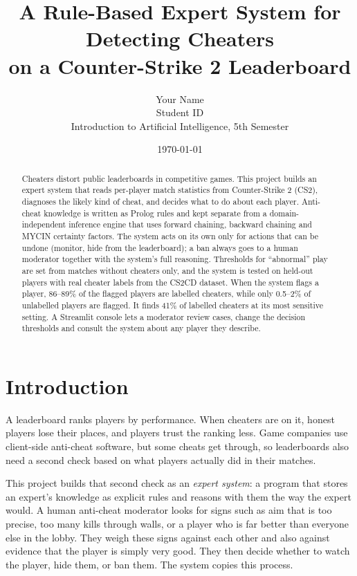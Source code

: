 \documentclass[11pt,a4paper]{article}
\title{A Rule-Based Expert System for Detecting Cheaters\\on a Counter-Strike 2 Leaderboard}
\author{Your Name \\ Student ID \\[4pt] \small Introduction to Artificial Intelligence, 5th Semester}
\date{\today}
\begin{document}
\maketitle

\begin{abstract}
Cheaters distort public leaderboards in competitive games. This project builds an expert system that
reads per-player match statistics from Counter-Strike 2 (CS2), diagnoses the likely kind of cheat,
and decides what to do about each player. Anti-cheat knowledge is written as Prolog rules and kept
separate from a domain-independent inference engine that uses forward chaining, backward chaining
and MYCIN certainty factors. The system acts on its own only for actions that can be undone
(monitor, hide from the leaderboard); a ban always goes to a human moderator together with the
system's full reasoning. Thresholds for ``abnormal'' play are set from matches without cheaters only,
and the system is tested on held-out players with real cheater labels from the CS2CD dataset. When
the system flags a player, 86--89\% of the flagged players are labelled cheaters, while only 0.5--2\%
of unlabelled players are flagged. It finds 41\% of labelled cheaters at its most sensitive setting.
A Streamlit console lets a moderator review cases, change the decision thresholds and consult the
system about any player they describe.
\end{abstract}

\section{Introduction}

A leaderboard ranks players by performance. When cheaters are on it, honest players lose their
places, and players trust the ranking less. Game companies use client-side anti-cheat software, but some
cheats get through, so leaderboards also need a second check based on what players actually did in
their matches.

This project builds that second check as an \emph{expert system}: a program that stores an expert's
knowledge as explicit rules and reasons with them the way the expert would. A human anti-cheat
moderator looks for signs such as aim that is too precise, too many kills through walls, or a player
who is far better than everyone else in the lobby. They weigh these signs against each other and
also against evidence that the player is simply very good. They then decide whether to watch the
player, hide them, or ban them. The system copies this process.
\end{document}
